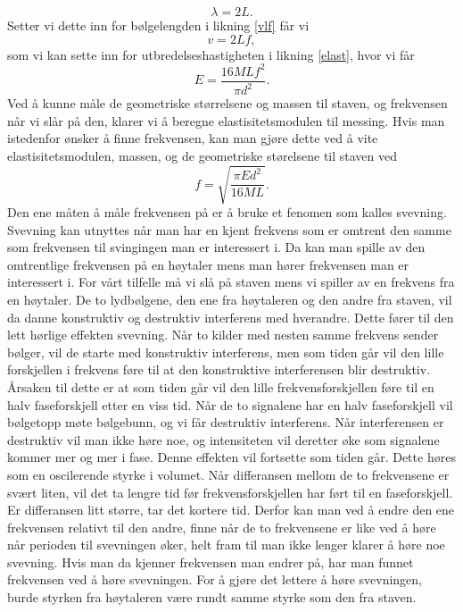 \documentclass[%
 reprint,
 amsmath,amssymb,
 aps,
 norsk,
 booktabs
]{revtex4-1}
\begin{document}
\begin{equation}
  \lambda = 2L.
\end{equation}
Setter vi dette inn for bølgelengden i likning \eqref{vlf} får vi
\begin{equation*}
  v = 2Lf,
\end{equation*}
som vi kan sette inn for utbredelseshastigheten i likning \eqref{elast}, hvor vi får
\begin{equation}
  E = \frac{16MLf^2}{\pi d^2}. \label{young5}
\end{equation}
Ved å kunne måle de geometriske størrelsene og massen til staven, og frekvensen når vi slår på den, klarer vi å beregne elastisitetsmodulen til messing. Hvis man istedenfor ønsker å finne frekvensen, kan man gjøre dette ved å vite elastisitetsmodulen, massen, og de geometriske størelsene til staven ved
\begin{equation}
  f = \sqrt{\frac{\pi E d^2}{16ML}}. \label{young6}
\end{equation}
Den ene måten å måle frekvensen på er å bruke et fenomen som kalles svevning. Svevning kan utnyttes når man har en kjent frekvens som er omtrent den samme som frekvensen til svingingen man er interessert i. Da kan man spille av den omtrentlige frekvensen på en høytaler mens man hører frekvensen man er interessert i. For vårt tilfelle må vi slå på staven mens vi spiller av en frekvens fra en høytaler. De to lydbølgene, den ene fra høytaleren og den andre fra staven, vil da danne konstruktiv og destruktiv interferens med hverandre. Dette fører til den lett hørlige effekten svevning. Når to kilder med nesten samme frekvens sender bølger, vil de starte med konstruktiv interferens, men som tiden går vil den lille forskjellen i frekvens føre til at den konstruktive interferensen blir destruktiv. Årsaken til dette er at som tiden går vil den lille frekvensforskjellen føre til en halv faseforskjell etter en viss tid. Når de to signalene har en halv faseforskjell vil bølgetopp møte bølgebunn, og vi får destruktiv interferens. Når interferensen er destruktiv vil man ikke høre noe, og intensiteten vil deretter øke som signalene kommer mer og mer i fase. Denne effekten vil fortsette som tiden går. Dette høres som en oscilerende styrke i volumet. Når differansen mellom de to frekvensene er svært liten, vil det ta lengre tid før frekvensforskjellen har ført til en faseforskjell. Er differansen litt større, tar det kortere tid. Derfor kan man ved å endre den ene frekvensen relativt til den andre, finne når de to frekvensene er like ved å høre når perioden til svevningen øker, helt fram til man ikke lenger klarer å høre noe svevning. Hvis man da kjenner frekvensen man endrer på, har man funnet frekvensen ved å høre svevningen. For å gjøre det lettere å høre svevningen, burde styrken fra høytaleren være rundt samme styrke som den fra staven.
\end{document}
